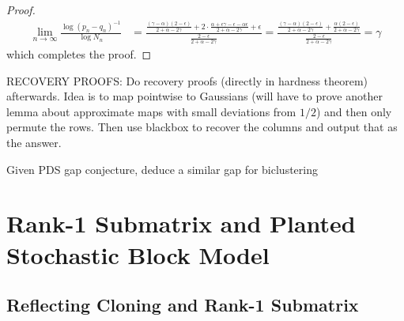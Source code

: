\documentclass[11pt]{article}
\begin{document}
\begin{proof}
\begin{align*}
\lim_{n \to \infty} \frac{\log (p_n - q_n)^{-1}}{\log N_n} &= \frac{\frac{(\gamma - \alpha)(2 - \epsilon)}{2 + \alpha - 2\gamma} + 2 \cdot \frac{\alpha + \epsilon \gamma - \epsilon - \alpha \epsilon}{2 + \alpha - 2\gamma} + \epsilon}{\frac{2 - \epsilon}{2 + \alpha - 2\gamma}} = \frac{\frac{(\gamma - \alpha)(2 - \epsilon)}{2 + \alpha - 2\gamma} + \frac{\alpha (2 - \epsilon)}{2 + \alpha - 2\gamma}}{\frac{2 - \epsilon}{2 + \alpha - 2\gamma}} = \gamma
\end{align*}
which completes the proof.
\end{proof}

RECOVERY PROOFS: Do recovery proofs (directly in hardness theorem) afterwards. Idea is to map pointwise to Gaussians (will have to prove another lemma about approximate maps with small deviations from $1/2$) and then only permute the rows. Then use blackbox to recover the columns and output that as the answer.

\begin{theorem}
Given PDS gap conjecture, deduce a similar gap for biclustering
\end{theorem}

\section{Rank-1 Submatrix and Planted Stochastic Block Model}

\subsection{Reflecting Cloning and Rank-1 Submatrix}

\end{document}
